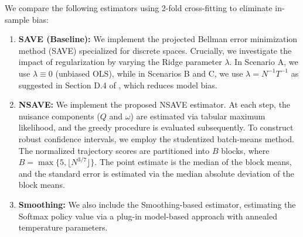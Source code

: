 \documentclass[12pt]{article}
\theoremstyle{remark}\newtheorem{remark}[theorem]{Remark}\theoremstyle{plain}
\begin{document}
We compare the following estimators using 2-fold cross-fitting to eliminate in-sample bias:
\begin{enumerate}
    \item[(i)] \textbf{SAVE (Baseline):} 
    We implement the projected Bellman error minimization method (SAVE) specialized for discrete spaces. 
    Crucially, we investigate the impact of regularization by varying the Ridge parameter $\lambda$. In Scenario A, we use $\lambda \equiv 0$ (unbiased OLS), while in Scenarios B and C, we use $\lambda = N^{-1} T^{-1} $ as suggested in Section D.4 of \cite{shi2022statistical}, which reduces model bias.
    
    \item[(ii)] \textbf{NSAVE:} 
    We implement the proposed NSAVE estimator.
    At each step, the nuisance components ($Q$ and $\omega$) are estimated via tabular maximum likelihood, and the greedy procedure is evaluated subsequently.
    To construct robust confidence intervals, we employ the studentized batch-means method. The normalized trajectory scores are partitioned into $B$ blocks,
    where $B = \max\{5,\lfloor N^{3/7}\rfloor\}$.
    The point estimate is the median of the block means, and the standard error is estimated via the median absolute deviation of the block means.
    
    \item[(iii)] \textbf{Smoothing:}
     We also include the Smoothing-based estimator, estimating the Softmax policy value via a plug-in model-based approach with annealed temperature parameters.
\end{enumerate}
\end{document}
